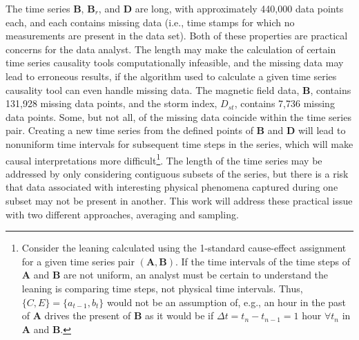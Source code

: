 The time series $\mathbf{B}$, $\mathbf{B}_r$, and $\mathbf{D}$ are long, with approximately 440,000 data points each, and each contains missing data (i.e., time stamps for which no measurements are present in the data set).  Both of these properties are practical concerns for the data analyst.  The length may make the calculation of certain time series causality tools computationally infeasible, and the missing data may lead to erroneous results, if the algorithm used to calculate a given time series causality tool can even handle missing data.  The magnetic field data, $\mathbf{B}$, contains 131,928 missing data points, and the storm index, $D_{st}$, contains 7,736 missing data points.  Some, but not all, of the missing data coincide within the time series pair.  Creating a new time series from the defined points of $\mathbf{B}$ and $\mathbf{D}$ will lead to nonuniform time intervals for subsequent time steps in the series, which will make causal interpretations more difficult\footnote{Consider the leaning calculated using the 1-standard cause-effect assignment for a given time series pair $(\mathbf{A},\mathbf{B})$.  If the time intervals of the time steps of $\mathbf{A}$ and $\mathbf{B}$ are not uniform, an analyst must be certain to understand the leaning is comparing time steps, not physical time intervals.  Thus, $\{C,E\}=\{a_{t-1},b_t\}$ would not be an assumption of, e.g., an hour in the past of $\mathbf{A}$ drives the present of $\mathbf{B}$ as it would be if $\Delta t = t_{n} - t_{n-1} = 1$ hour $\forall t_n$ in $\mathbf{A}$ and $\mathbf{B}$.}.  The length of the time series may be addressed by only considering contiguous subsets of the series, but there is a risk that data associated with interesting physical phenomena captured during one subset may not be present in another.  This work will address these practical issue with two different approaches, averaging and sampling.
